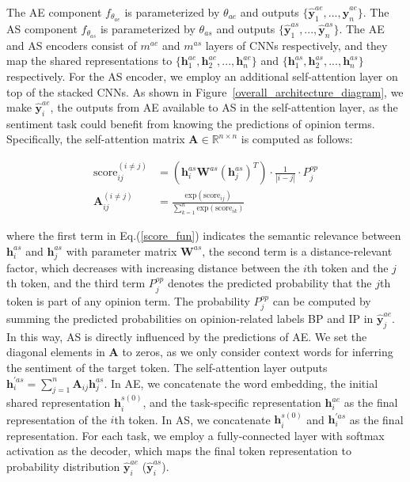 \documentclass[11pt,a4paper]{article}
\begin{document}
The AE component $f_{\theta_{ae}}$ is parameterized by $\theta_{ae}$ and outputs $\{\hat{\mathbf{y}}_1^{ae},...,\hat{\mathbf{y}}_n^{ae}\}$. The AS component $f_{\theta_{as}}$ is parameterized by $\theta_{as}$ and outputs $\{\hat{\mathbf{y}}_1^{as},...,\hat{\mathbf{y}}_n^{as}\}$.
The AE and AS encoders consist of $m^{ae}$ and $m^{as}$ layers of CNNs respectively, and they map the shared representations to $\{\mathbf{h}^{ae}_{1}, \mathbf{h}^{ae}_{2}, ..., \mathbf{h}^{ae}_{n}\}$ and $\{\mathbf{h}^{as}_{1}, \mathbf{h}^{as}_{2}, ..., \mathbf{h}^{as}_{n}\}$ respectively. For the AS encoder, we employ an additional self-attention layer on top of the stacked CNNs.
As shown in Figure~\ref{overall_architecture_diagram}, we make $\hat{\mathbf{y}}_i^{ae}$, the outputs from AE available to AS in the self-attention layer, as the sentiment task could benefit from knowing the predictions of opinion terms.  Specifically, the self-attention matrix $\mathbf{A} \in \mathbb{R}^{n \times n}$ is computed as follows:

\begin{small}
\begin{align}
    \text{score}_{ij}^{(i \neq j)} &= (\mathbf{h}_i^{as} \mathbf{W}^{as} (\mathbf{h}_j^{as})^T) \cdot \frac{1}{|i-j|} \cdot P_j^{op}\label{score_fun} \\
    \mathbf{A}_{ij}^{(i \neq j)} &= \frac{\text{exp}(\text{score}_{ij})}{\sum_{k=1}^n \text{exp}(\text{score}_{ik})} 
\end{align}
\end{small}
\noindent where the first term in Eq.(\ref{score_fun}) indicates the semantic relevance between $\mathbf{h}_i^{as}$ and $\mathbf{h}_j^{as}$ with parameter matrix $\mathbf{W}^{as}$, the second term is a distance-relevant factor, which decreases with increasing distance between the $i$th token and the $j$th token, and the third term $P_j^{op}$ denotes the predicted probability that the $j$th token is part of any opinion term. The probability $P_j^{op}$ can be computed by summing the predicted probabilities on opinion-related labels BP and IP in  $\hat{\mathbf{y}}_j^{ae}$. In this way, AS is directly influenced by the predictions of AE. We set the diagonal elements in $\mathbf{A}$ to zeros, as we only consider context words for inferring the sentiment of the target token. The self-attention layer outputs $\mathbf{h}_i^{\prime as} = \sum_{j=1}^n \mathbf{A}_{ij} \mathbf{h}_j^{as}$. In AE, we concatenate the word embedding, the initial shared representation $\mathbf{h}_i^{s(0)}$, and the task-specific representation  $\mathbf{h}_i^{ae}$ as the final representation of the $i$th token. In AS, we concatenate $\mathbf{h}_i^{s(0)}$ and $\mathbf{h}_i^{\prime as}$ as the final representation. For each task, we employ a fully-connected layer with softmax activation as the decoder, which maps the final token representation to probability distribution $\hat{\mathbf{y}}_i^{ae}$ ($\hat{\mathbf{y}}_i^{as}$).
\end{document}
